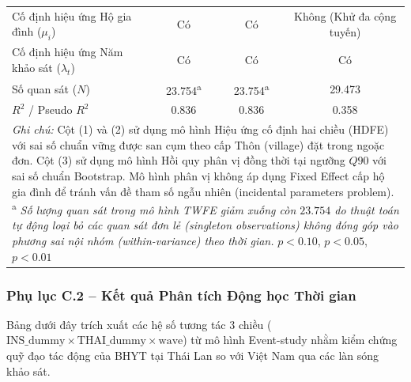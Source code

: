\documentclass[12pt,a4paper]{article}
\begin{document}
\begin{table}[htbp]
{\begin{tabular}{lccc}
			Cố định hiệu ứng Hộ gia đình ($\mu_i$) & Có & Có & Không (Khử đa cộng tuyến) \\
			Cố định hiệu ứng Năm khảo sát ($\lambda_t$) & Có & Có & Có \\
			\midrule
			Số quan sát ($N$) & 23.754\textsuperscript{a} & 23.754\textsuperscript{a} & 29.473 \\
			$R^2$ / Pseudo $R^2$ & 0.836 & 0.836 & 0.358 \\
			\bottomrule
			\multicolumn{4}{p{16cm}}{\footnotesize \textit{Ghi chú:} Cột (1) và (2) sử dụng mô hình Hiệu ứng cố định hai chiều (HDFE) với sai số chuẩn vững được san cụm theo cấp Thôn (village) đặt trong ngoặc đơn. Cột (3) sử dụng mô hình Hồi quy phân vị đồng thời tại ngưỡng $Q90$ với sai số chuẩn Bootstrap. Mô hình phân vị không áp dụng Fixed Effect cấp hộ gia đình để tránh vấn đề tham số ngẫu nhiên (incidental parameters problem). \newline 
				\textsuperscript{a} \textit{Số lượng quan sát trong mô hình TWFE giảm xuống còn $23.754$ do thuật toán tự động loại bỏ các quan sát đơn lẻ (singleton observations) không đóng góp vào phương sai nội nhóm (within-variance) theo thời gian.} \newline
				\sym{*} \(p<0.10\), \sym{**} \(p<0.05\), \sym{***} \(p<0.01\)}
		\end{tabular}
	}
\end{table}

\clearpage
\subsubsection{Phụ lục C.2 – Kết quả Phân tích Động học Thời gian}

Bảng dưới đây trích xuất các hệ số tương tác 3 chiều ($\text{INS\_dummy} \times \text{THAI\_dummy} \times \text{wave}$) từ mô hình Event-study nhằm kiểm chứng quỹ đạo tác động của BHYT tại Thái Lan so với Việt Nam qua các làn sóng khảo sát.
\end{document}
